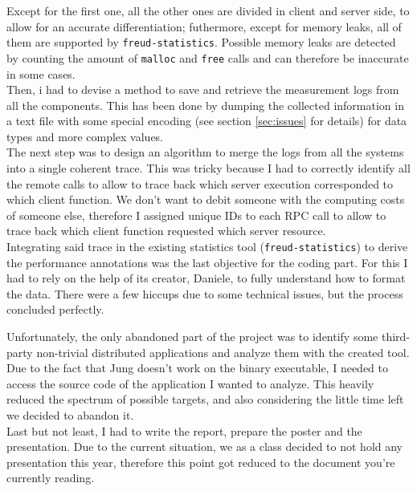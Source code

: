         Except for the first one, all the other ones are divided in client and server side, to allow for an
        accurate differentiation; futhermore, except for memory leaks, all of them are supported by 
        \texttt{freud-statistics}. Possible memory leaks are detected by counting the amount of \texttt{malloc}
        and \texttt{free} calls and can therefore be inaccurate in some cases.\\

        Then, i had to devise a method to save and retrieve the measurement logs from all the components.
        This has been done by dumping the collected information in a text file with some special encoding
        (see section \ref{sec:issues} for details) for data types and more complex values.\\

        The next step was to design an algorithm to merge the logs from all the systems into a single
        coherent trace. This was tricky because I had to correctly identify all the remote calls to allow
        to trace back which server execution corresponded to which client function. We don't want to debit
        someone with the computing costs of someone else, therefore I assigned unique IDs to each
        RPC call to allow to trace back which client function requested which server resource.\\

        Integrating said trace in the existing statistics tool (\texttt{freud-statistics}) to derive
        the performance annotations was the last objective for the coding part. For this I had to rely on the
        help of its creator, Daniele, to fully understand how to format the data. There were a few hiccups due to
        some technical issues, but the process concluded perfectly.

        Unfortunately, the only abandoned part of the project was to identify some third-party non-trivial
        distributed applications and analyze them with the created tool. Due to the fact that Jung doesn't work 
        on the binary executable, I needed to access the source code of the application I wanted to 
        analyze. This heavily reduced the spectrum of possible targets, and also considering the little time left we
        decided to abandon it.\\

        Last but not least, I had to write the report, prepare the poster and the presentation. Due to the current
        situation, we as a class decided to not hold any presentation this year, therefore this point got reduced
        to the document you're currently reading.\\
        
